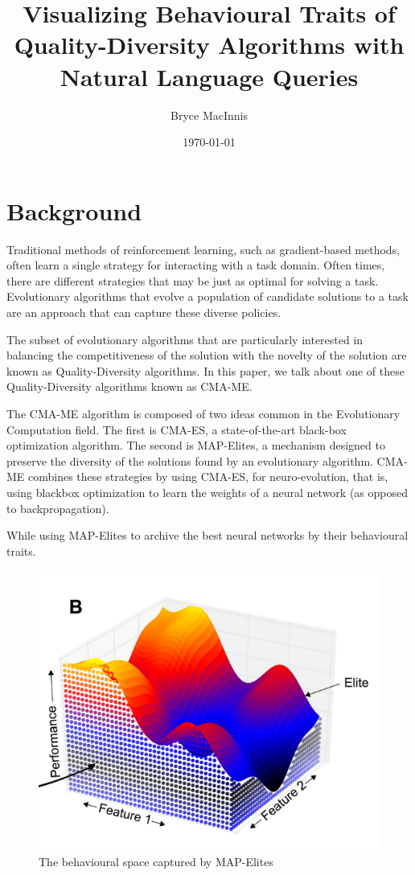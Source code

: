 \documentclass[11pt]{article}
\author{Bryce MacInnis}
\date{\today}
\title{Visualizing Behavioural Traits of Quality-Diversity Algorithms with Natural Language Queries}
\begin{document}
\maketitle
\section{Background}
\label{sec:orgee02425}

Traditional methods of reinforcement learning, such as gradient-based methods, often learn a
single strategy for interacting with a task domain. Often times, there are different strategies
that may be just as optimal for solving a task. Evolutionary algorithms that evolve a population
of candidate solutions to a task are an approach that can capture these diverse policies.

The subset of evolutionary algorithms that are particularly interested in balancing the competitiveness
of the solution with the novelty of the solution are known as Quality-Diversity algorithms.
In this paper, we talk about one of these Quality-Diversity algorithms known as CMA-ME.

The CMA-ME algorithm is composed of two ideas common in the Evolutionary Computation field.
The first is CMA-ES, a state-of-the-art black-box optimization algorithm. The second is MAP-Elites,
a mechanism designed to preserve the diversity of the solutions found by an evolutionary algorithm.
CMA-ME combines these strategies by using CMA-ES, for neuro-evolution, that is, using
blackbox optimization to learn the weights of a neural network (as opposed to backpropagation).

While using MAP-Elites to archive the best neural networks by their behavioural traits.

\begin{figure}[htbp]
\centering
\includegraphics[width=.9\linewidth]{./map-elites.png}
\caption{The behavioural space captured by MAP-Elites}
\end{figure}
\end{document}
